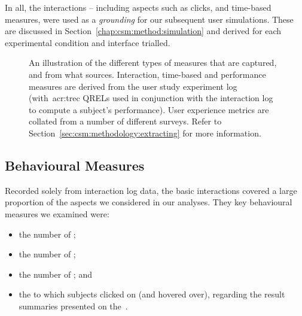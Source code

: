 In all, the interactions -- including aspects such as clicks, and time-based measures, were used as a \emph{grounding} for our subsequent user simulations. These are discussed in Section~\ref{chap:csm:method:simulation} and derived for each experimental condition and interface trialled.

\begin{figure}[t!]
    \centering
    \caption[Examples of Evaluation Measures]{An illustration of the different types of measures that are captured, and from what sources. Interaction, time-based and performance measures are derived from the user study experiment log (with~\gls{acr:trec} QRELs used in conjunction with the interaction log to compute a subject's performance). User experience metrics are collated from a number of different surveys. Refer to Section~\ref{sec:csm:methodology:extracting} for more information.}
    \label{fig:evaluation_methodology}
\end{figure}

\subsection{Behavioural Measures}
Recorded solely from interaction log data, the basic interactions covered a large proportion of the aspects we considered in our analyses. They key behavioural measures we examined were:

\begin{itemize}
    \item{the number of ;}
    \item{the number of ;}
    \item{the number of ; and}
    \item{the  to which subjects clicked on (and hovered over), regarding the result summaries presented on the~.}
\end{itemize}

